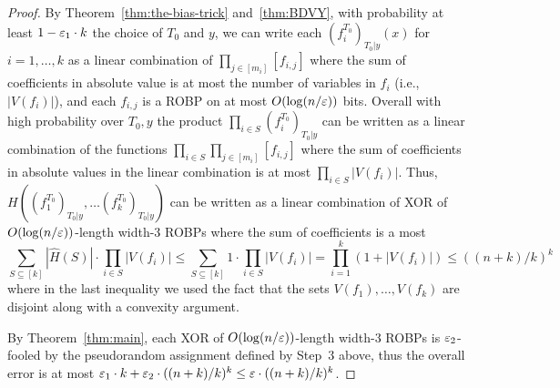 \begin{proof}
By Theorem~\ref{thm:the-bias-trick} and~\ref{thm:BDVY}, with  probability at least $1-\varepsilon_1\cdot k$ the choice of $T_0$ and $y$, we can write each $(f_i^{T_0})_{T_0|y}(x)$ for $i=1, \ldots, k$ as a linear combination of $\prod_{j \in [m_i]}[f_{i,j}]$ where the sum of coefficients in absolute value is at most the number of variables in $f_i$ (i.e., $|V(f_i)|$), and each $f_{i,j}$ is a ROBP on at most $O(\log(n/\varepsilon))$ bits.
Overall with high probability over $T_0, y$ the product $\prod_{i\in S} (f_i^{T_0})_{T_0|y}$ can be written as a linear combination of the functions $\prod_{i\in S} \prod_{j \in [m_i]}[f_{i,j}]$ where the sum of coefficients in absolute values in the linear combination is at most $\prod_{i\in S}{|V(f_i)|}$.
Thus, $H((f_1^{T_0})_{T_0|y}, \ldots (f_k^{T_0})_{T_0|y})$ can be written as a linear combination of XOR of $O(\log(n/\varepsilon))$-length width-3 ROBPs where the sum of coefficients is a most
$$
\sum_{S\subseteq [k]} |\hat{H}(S)| \cdot \prod_{i\in S}|V(f_i)| 
\le \sum_{S\subseteq [k]} 1 \cdot \prod_{i\in S}|V(f_i)| 
= \prod_{i=1}^{k}(1+|V(f_i)|) 
\le ((n+k)/k)^k
$$
where in the last inequality we used the fact that the sets $V(f_1), \ldots, V(f_k)$ are disjoint along with a convexity argument.

By Theorem~\ref{thm:main}, each XOR of $O(\log(n/\varepsilon))$-length width-3 ROBPs is $\varepsilon_2$-fooled by the pseudorandom assignment defined by Step~3 above, thus the overall error is at most $\varepsilon_1\cdot k + \varepsilon_2 \cdot ((n+k)/k)^k \le \varepsilon\cdot ((n+k)/k)^k$.
\end{proof}


